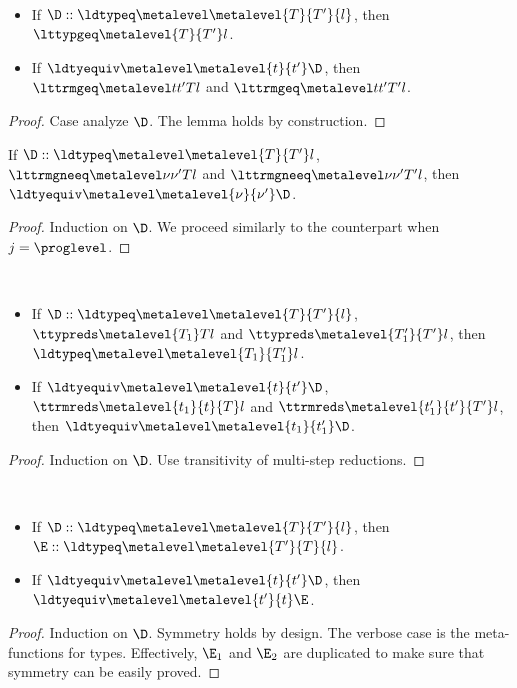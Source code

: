 \begin{lemma}[Escape] $ $
  \begin{itemize}
  \item If $\D :: \ldtypeq \metalevel \metalevel{T}{T'}{l}$, then $\lttypgeq \metalevel {T}{T'} l$.
  \item If $\ldtyequiv \metalevel \metalevel{t}{t'}\D$, then $\lttrmgeq \metalevel t{t'} T l$ and $\lttrmgeq \metalevel t{t'}{T'} l$.
  \end{itemize}  
\end{lemma}
\begin{proof}
  Case analyze $\D$. %
  The lemma holds by construction.
\end{proof}

\begin{lemma}
  If $\D :: \ldtypeq \metalevel \metalevel{T}{T'}l$, $\lttrmgneeq \metalevel \nu{\nu'} T l$ and $\lttrmgneeq \metalevel
  \nu{\nu'}{T'} l$, then $\ldtyequiv \metalevel \metalevel{\nu}{\nu'}\D$.
\end{lemma}
\begin{proof}
  Induction on $\D$. %
  We proceed similarly to the counterpart when $j = \proglevel$. 
\end{proof}

\begin{lemma} $ $
  \begin{itemize}
  \item If $\D :: \ldtypeq \metalevel \metalevel{T}{T'}{l}$, $\ttypreds \metalevel{T_1} T l$ and $\ttypreds
    \metalevel{T_1'}{T'}l$, then\break $\ldtypeq \metalevel \metalevel{T_1}{T_1'} l$.
  \item If $\ldtyequiv \metalevel \metalevel{t}{t'}\D$, $\ttrmreds \metalevel{t_1}{t}{T} l$ and $\ttrmreds
    \metalevel{t_1'}{t'}{T'}l$, then $\ldtyequiv \metalevel \metalevel{t_1}{t_1'} \D$.
  \end{itemize}  
\end{lemma}
\begin{proof}
  Induction on $\D$. %
  Use transitivity of multi-step reductions.
\end{proof}

\begin{lemma}[Symmetry] $ $
  \begin{itemize}
  \item If $\D :: \ldtypeq \metalevel \metalevel{T}{T'}{l}$, then $\E :: \ldtypeq \metalevel \metalevel{T'}{T}{l}$.
  \item If $\ldtyequiv \metalevel \metalevel{t}{t'}\D$, then $\ldtyequiv \metalevel \metalevel{t'}{t}\E$. 
  \end{itemize}
\end{lemma}
\begin{proof}
  Induction on $\D$. %
  Symmetry holds by design. %
  The verbose case is the meta-functions for types. %
  Effectively, $\E_1$ and $\E_2$ are duplicated to make sure that symmetry can be easily proved.
\end{proof}

